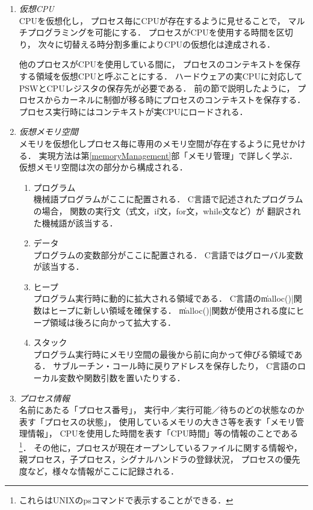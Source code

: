 \begin{enumerate}
\item \emph{仮想CPU} \\
  CPUを仮想化し，
  プロセス毎にCPUが存在するように見せることで，
  マルチプログラミングを可能にする．
  プロセスがCPUを使用する時間を区切り，
  次々に切替える時分割多重によりCPUの仮想化は達成される．

  他のプロセスがCPUを使用している間に，
  プロセスのコンテキストを保存する領域を仮想CPUと呼ぶことにする．
  ハードウェアの実CPUに対応してPSWとCPUレジスタの保存先が必要である．
  前の節で説明したように，
  プロセスからカーネルに制御が移る時にプロセスのコンテキストを保存する．
  プロセス実行時にはコンテキストが実CPUにロードされる．
\item \emph{仮想メモリ空間} \\
  メモリを仮想化しプロセス毎に専用のメモリ空間が存在するように見せかける．
  実現方法は第\ref{memoryManagement}部「メモリ管理」で詳しく学ぶ．
  仮想メモリ空間は次の部分から構成される．
  \begin{enumerate}
  \item プログラム \\
    機械語プログラムがここに配置される．
    C言語で記述されたプログラムの場合，
    関数の実行文（式文，if文，for文，while文など）が
    翻訳された機械語が該当する．
  \item データ \\
    プログラムの変数部分がここに配置される．
    C言語ではグローバル変数が該当する．
  \item ヒープ \\
    プログラム実行時に動的に拡大される領域である．
    C言語の\|malloc()|関数はヒープに新しい領域を確保する．
    \|malloc()|関数が使用される度にヒープ領域は後ろに向かって拡大する．
  \item スタック \\
    プログラム実行時にメモリ空間の最後から前に向かって伸びる領域である．
    サブルーチン・コール時に戻りアドレスを保存したり，
    C言語のローカル変数や関数引数を置いたりする．
  \end{enumerate}
\item \emph{プロセス情報} \\
  名前にあたる「プロセス番号」，
  実行中／実行可能／待ちのどの状態なのか表す「プロセスの状態」，
  使用しているメモリの大きさ等を表す「メモリ管理情報」，
  CPUを使用した時間を表す「CPU時間」等の情報のことである\footnote{
    これらはUNIXのpsコマンドで表示することができる．}．
  その他に，プロセスが現在オープンしているファイルに関する情報や，
  親プロセス，子プロセス，シグナルハンドラの登録状況，
  プロセスの優先度など，様々な情報がここに記録される．
\end{enumerate}

